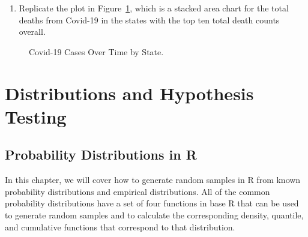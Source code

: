 \documentclass[
  letterpaper,
]{krantz}
\providecommand{\tightlist}{%
  \setlength{\itemsep}{0pt}\setlength{\parskip}{0pt}}\usepackage{longtable,booktabs,array}
\begin{document}
\begin{enumerate}
\def\labelenumi{\arabic{enumi}.}
\setcounter{enumi}{1}
\tightlist
\item
  Replicate the plot in Figure~\ref{fig-covid-area-chart}, which is a
  stacked area chart for the total deaths from Covid-19 in the states
  with the top ten total death counts overall.
\end{enumerate}

\begin{figure}


\caption{\label{fig-covid-area-chart}Covid-19 Cases Over Time by State.}

\end{figure}%

\part{Distributions and Hypothesis Testing}

\chapter{Probability Distributions in
R}\label{sec-probability-distributions}

In this chapter, we will cover how to generate random samples in R from
known probability distributions and empirical distributions. All of the
common probability distributions have a set of four functions in base R
that can be used to generate random samples and to calculate the
corresponding density, quantile, and cumulative functions that
correspond to that distribution.
\end{document}
